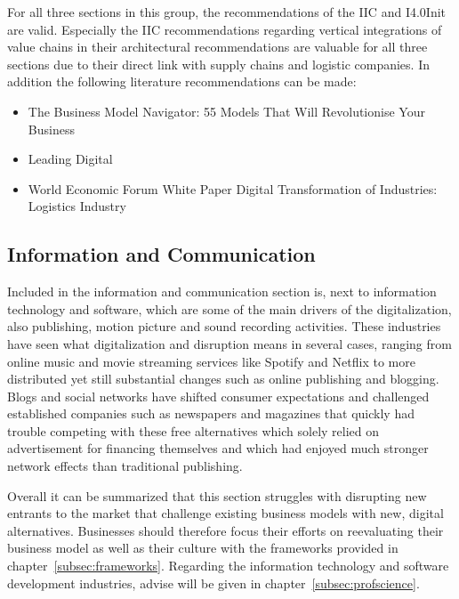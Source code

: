 For all three sections in this group, the recommendations of the \ac{IIC} and \ac{I4.0Init} are valid. Especially the \ac{IIC} recommendations regarding vertical integrations of value chains in their architectural recommendations \cite{iicarchitecture:2016} are valuable for all three sections due to their direct link with supply chains and logistic companies. In addition the following literature recommendations can be made:

\begin{itemize}
    \item The Business Model Navigator: 55 Models That Will Revolutionise Your Business \cite{gassmann:gallen:2013geschaeftsmodelle}
    \item Leading Digital \cite{bonnect2014leading}
    \item World Economic Forum White Paper Digital Transformation of Industries: Logistics Industry \cite{worldforumlogistics:2016}
\end{itemize}

\subsection{Information and Communication}
Included in the information and communication section is, next to information technology and software, which are some of the main drivers of the digitalization, also publishing, motion picture and sound recording activities. These industries have seen what digitalization and disruption means in several cases, ranging from online music and movie streaming services like Spotify and Netflix to more distributed yet still substantial changes such as online publishing and blogging. Blogs and social networks have shifted consumer expectations and challenged established companies such as newspapers and magazines that quickly had trouble competing with these free alternatives which solely relied on advertisement for financing themselves and which had enjoyed much stronger network effects than traditional publishing. 

Overall it can be summarized that this section struggles with disrupting new entrants to the market that challenge existing business models with new, digital alternatives. Businesses should therefore focus their efforts on reevaluating their business model as well as their culture with the frameworks provided in chapter~\ref{subsec:frameworks}. Regarding the information technology and software development industries, advise will be given in chapter~\ref{subsec:profscience}. 

